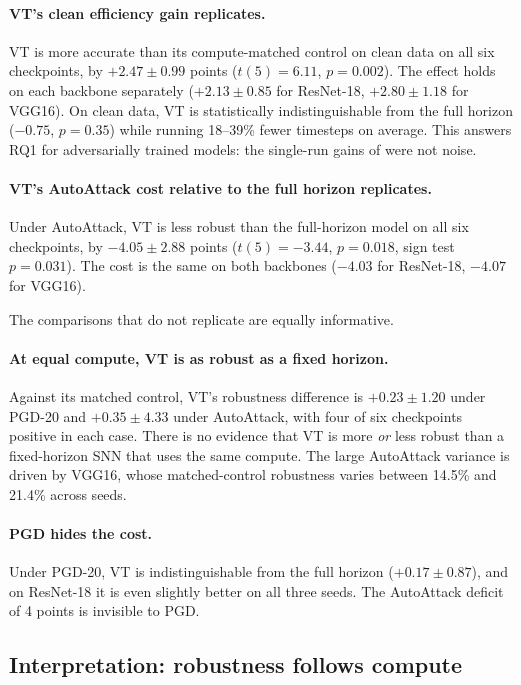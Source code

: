 \paragraph{VT's clean efficiency gain replicates.} VT is more accurate than its compute-matched control on clean data on all six checkpoints, by $+2.47 \pm 0.99$ points ($t(5) = 6.11$, $p = 0.002$). The effect holds on each backbone separately ($+2.13 \pm 0.85$ for ResNet-18, $+2.80 \pm 1.18$ for VGG16). On clean data, VT is statistically indistinguishable from the full horizon ($-0.75$, $p = 0.35$) while running 18--39\% fewer timesteps on average. This answers RQ1 for adversarially trained models: the single-run gains of  were not noise.

\paragraph{VT's AutoAttack cost relative to the full horizon replicates.} Under AutoAttack, VT is less robust than the full-horizon model on all six checkpoints, by $-4.05 \pm 2.88$ points ($t(5) = -3.44$, $p = 0.018$, sign test $p = 0.031$). The cost is the same on both backbones ($-4.03$ for ResNet-18, $-4.07$ for VGG16).

The comparisons that do not replicate are equally informative.

\paragraph{At equal compute, VT is as robust as a fixed horizon.} Against its matched control, VT's robustness difference is $+0.23 \pm 1.20$ under PGD-20 and $+0.35 \pm 4.33$ under AutoAttack, with four of six checkpoints positive in each case. There is no evidence that VT is more \emph{or} less robust than a fixed-horizon SNN that uses the same compute. The large AutoAttack variance is driven by VGG16, whose matched-control robustness varies between 14.5\% and 21.4\% across seeds.

\paragraph{PGD hides the cost.} Under PGD-20, VT is indistinguishable from the full horizon ($+0.17 \pm 0.87$), and on ResNet-18 it is even slightly better on all three seeds. The AutoAttack deficit of 4 points is invisible to PGD.

\subsection{Interpretation: robustness follows compute}


